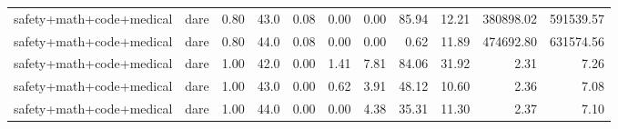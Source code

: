 \begin{table}[H]
{\begin{tabular}{llllrrrrrrr}
safety+math+code+medical & dare & 0.80 & 43.0 & 0.08 & 0.00 & 0.00 & 85.94 & 12.21 & 380898.02 & 591539.57 \\
safety+math+code+medical & dare & 0.80 & 44.0 & 0.08 & 0.00 & 0.00 & 0.62 & 11.89 & 474692.80 & 631574.56 \\
safety+math+code+medical & dare & 1.00 & 42.0 & 0.00 & 1.41 & 7.81 & 84.06 & 31.92 & 2.31 & 7.26 \\
safety+math+code+medical & dare & 1.00 & 43.0 & 0.00 & 0.62 & 3.91 & 48.12 & 10.60 & 2.36 & 7.08 \\
safety+math+code+medical & dare & 1.00 & 44.0 & 0.00 & 0.00 & 4.38 & 35.31 & 11.30 & 2.37 & 7.10 \\
\bottomrule
\end{tabular}
}
\end{table}